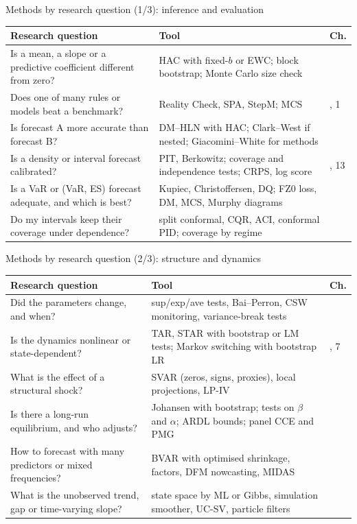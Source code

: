 \begin{frame}{Methods by research question (1/3): inference and evaluation}
\itemsize{\small}
\begin{center}
\footnotesize
\begin{tabular}{>{\raggedright\arraybackslash}p{4.9cm}>{\raggedright\arraybackslash}p{5.6cm}>{\raggedright\arraybackslash}p{0.8cm}}
\toprule
\textbf{Research question} & \textbf{Tool} & \textbf{Ch.} \\
\midrule
Is a mean, a slope or a predictive coefficient different from zero? & HAC with fixed-$b$ or EWC; block bootstrap; Monte Carlo size check & 0 \\
Does one of many rules or models beat a benchmark? & Reality Check, SPA, StepM; MCS & 0, 1 \\
Is forecast A more accurate than forecast B? & DM--HLN with HAC; Clark--West if nested; Giacomini--White for methods & 1 \\
Is a density or interval forecast calibrated? & PIT, Berkowitz; coverage and independence tests; CRPS, log score & 1, 13 \\
Is a VaR or (VaR, ES) forecast adequate, and which is best? & Kupiec, Christoffersen, DQ; FZ0 loss, DM, MCS, Murphy diagrams & 9 \\
Do my intervals keep their coverage under dependence? & split conformal, CQR, ACI, conformal PID; coverage by regime & 13 \\
\bottomrule
\end{tabular}
\end{center}
\end{frame}

\begin{frame}{Methods by research question (2/3): structure and dynamics}
\itemsize{\small}
\begin{center}
\footnotesize
\begin{tabular}{>{\raggedright\arraybackslash}p{4.9cm}>{\raggedright\arraybackslash}p{5.6cm}>{\raggedright\arraybackslash}p{0.8cm}}
\toprule
\textbf{Research question} & \textbf{Tool} & \textbf{Ch.} \\
\midrule
Did the parameters change, and when? & sup/exp/ave tests, Bai--Perron, CSW monitoring, variance-break tests & 2 \\
Is the dynamics nonlinear or state-dependent? & TAR, STAR with bootstrap or LM tests; Markov switching with bootstrap LR & 2, 7 \\
What is the effect of a structural shock? & SVAR (zeros, signs, proxies), local projections, LP-IV & 3 \\
Is there a long-run equilibrium, and who adjusts? & Johansen with bootstrap; tests on $\beta$ and $\alpha$; ARDL bounds; panel CCE and PMG & 4 \\
How to forecast with many predictors or mixed frequencies? & BVAR with optimised shrinkage, factors, DFM nowcasting, MIDAS & 5 \\
What is the unobserved trend, gap or time-varying slope? & state space by ML or Gibbs, simulation smoother, UC-SV, particle filters & 6 \\
\bottomrule
\end{tabular}
\end{center}
\end{frame}

